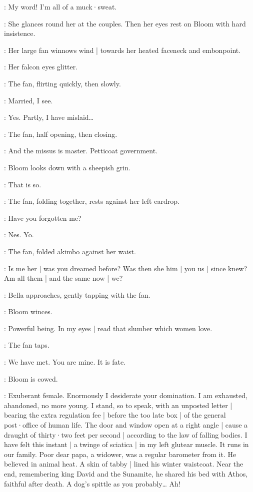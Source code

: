 \Bella:
My word!
%
I'm all of a muck·sweat.

:
She glances round her at the couples.
Then her eyes rest on Bloom with hard insistence.

:
Her large fan winnows wind |
towards her heated faceneck and embonpoint.

:
Her falcon eyes glitter.

:
The fan,
flirting quickly,
then slowly.

\Fan:
Married,
I see.

\Bloom:
Yes.
Partly,
I have mislaid…

:
The fan,
half opening,
then closing.

\Fan:
And the missus is master.
Petticoat government.%

:
Bloom looks down with a sheepish grin.

\Bloom:
That is so.

:
The fan,
folding together,
rests against her left eardrop.

\Fan:
Have you forgotten me?

\Bloom:
Nes. Yo.

:
The fan,
folded akimbo against her waist.

\Fan:
Is me her |
was you dreamed before?
Was then she him |
you us |
since knew?
Am all them |
and the same now |
we?

:
Bella approaches,
%
gently tapping with the fan.

:
Bloom winces.

\Bloom:
Powerful being.
In my eyes |
read that slumber which women love.

:
The fan taps.

\Fan:
We have met.
You are mine.
It is fate.

:
Bloom is cowed.

\Bloom:
Exuberant female.
Enormously I desiderate your domination.
I am exhausted,
abandoned,
no more young.
I stand,
so to speak,
with an unposted letter |
bearing the extra regulation fee |
before the too late box |
of the general post·office of human life.
%
The door and window open at a right angle |
cause a draught of thirty·two feet per second |
according to the law of falling bodies.
I have felt this instant |
a twinge of sciatica |
in my left glutear muscle.
It runs in our family.
Poor dear papa,
a widower,
was a regular barometer from it.
He believed in animal heat.
A skin of tabby |
lined his winter waistcoat.
Near the end,
remembering king David and the Sunamite,
he shared his bed with Athos,
faithful after death.
A dog's spittle as you probably…
Ah!


